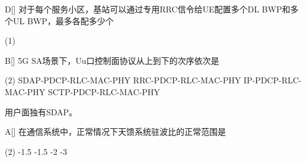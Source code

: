 
\begin{choice}{D}[]
	对于每个服务小区，基站可以通过专用RRC信令给UE配置多个DL BWP和多个UL BWP，最多各配多少个
	\begin{tasks}(1)
	\end{tasks}
\end{choice}

\begin{choice}{B}[]
	5G SA场景下，Uu口控制面协议从上到下的次序依次是
	\begin{tasks}(2)
		\task SDAP-PDCP-RLC-MAC-PHY
		\task RRC-PDCP-RLC-MAC-PHY
		\task IP-PDCP-RLC-MAC-PHY
		\task SCTP-PDCP-RLC-MAC-PHY
	\end{tasks}
\end{choice}

\begin{solution}
	用户面独有SDAP。
\end{solution}


\begin{choice}{A}[]
	在通信系统中，正常情况下天馈系统驻波比的正常范围是
	\begin{tasks}(2)
		-1.5
		-1.5
		-2
		-3
	\end{tasks}
\end{choice}


